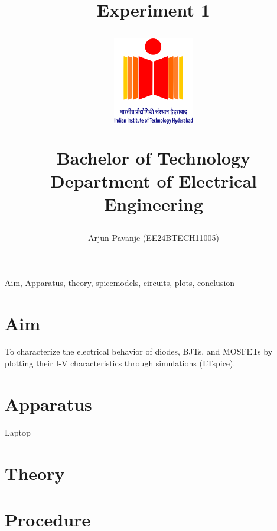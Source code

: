 \documentclass[12pt,a4paper]{report}
\begin{document}
\title{\textbf{Experiment 1}\\
\LARGE{\textbf{ }}
\author{ Arjun Pavanje (EE24BTECH11005)}

\begin{center}
\end{center}
\vspace{30pt}
\begin{figure}[ht]
	\centering
	\includegraphics[width = 100pt]{logo.png}\\
\end{figure}
\begin{center}
	Bachelor of Technology\\
	\vspace{10pt}
	Department of Electrical Engineering\\
\end{center}
}
\maketitle


Aim, Apparatus, theory, spicemodels, circuits, plots, conclusion
\section{Aim} To characterize the electrical behavior of diodes, BJTs, and MOSFETs by plotting their I-V characteristics through simulations (LTspice).
\section{Apparatus}
Laptop
\section{Theory}
\section{Procedure}
\end{document}
